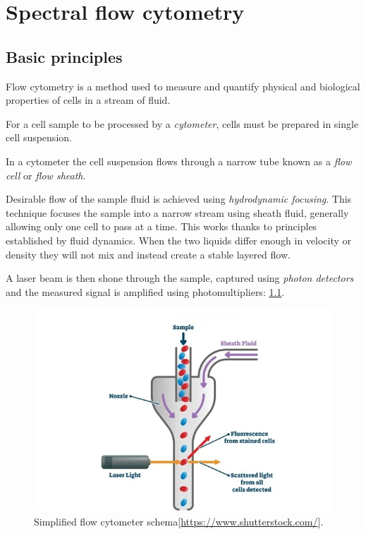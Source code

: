 \chapter{Spectral flow cytometry}
\label{chap:refs}

\section{Basic principles}
\label{subs:basic}
Flow cytometry is a method used to measure and quantify physical and biological properties of cells in a stream of fluid. 

For a cell sample to be processed by a \emph{cytometer}, cells must be prepared in single cell suspension. 

In a cytometer the cell suspension flows through a narrow tube known as a \emph{flow cell} or \emph{flow sheath}. 

Desirable flow of the sample fluid is achieved using \emph{hydrodynamic focusing}. This technique focuses the sample into a narrow stream using sheath fluid, generally allowing only one cell to pass at a time. This works thanks to principles established by fluid dynamics. When the two liquids differ enough in velocity or density they will not mix and instead create a stable layered flow\cite{HydrodynF2012}. 

A laser beam is then shone through the sample, captured using \emph{photon detectors} and the measured signal is amplified using photomultipliers: \cref{fig:cytm}.

\begin{figure}
  \includegraphics[width=0.9\linewidth]{img/hydro.png}
  \caption{Simplified flow cytometer schema[\url{https://www.shutterstock.com/}].}
  \label{fig:cytm}
\end{figure}

